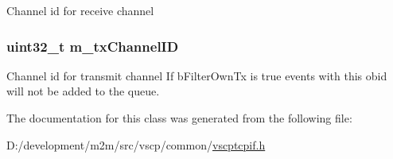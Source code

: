 \label{d8/dde/classctrl_obj_vscp_tcp_if_a22384f365f0617f660bed9330bb637d7}
Channel id for receive channel \hypertarget{classctrl_obj_vscp_tcp_if_a1c2e68222d7d935dbcbf2efefa33d46f}{
\subsubsection[{m\_\-txChannelID}]{\setlength{\rightskip}{0pt plus 5cm}uint32\_\-t {\bf m\_\-txChannelID}}}
\label{d8/dde/classctrl_obj_vscp_tcp_if_a1c2e68222d7d935dbcbf2efefa33d46f}
Channel id for transmit channel If bFilterOwnTx is true events with this obid will not be added to the queue. 

The documentation for this class was generated from the following file:\begin{DoxyCompactItemize}
\item 
D:/development/m2m/src/vscp/common/\hyperlink{vscptcpif_8h}{vscptcpif.h}\end{DoxyCompactItemize}
